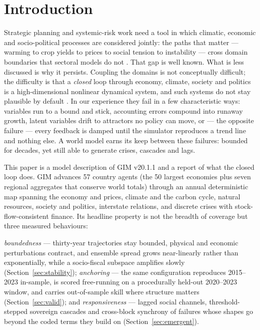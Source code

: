 \documentclass[12pt,a4paper]{article}
\newcommand{\Version}{v20.1.1}
\begin{document}
\section{Introduction}
\label{sec:intro}

Strategic planning and systemic-risk work need a tool in which climatic, economic and
socio-political processes are considered jointly: the paths that matter --- warming to crop
yields to prices to social tension to instability --- cross domain boundaries that sectoral
models do not \citep{nordhaus2017,riahi2017}. That gap is well known. What is less discussed
is why it persists. Coupling the domains is not conceptually difficult; the difficulty is
that a \emph{closed} loop through economy, climate, society and politics is a
high-dimensional nonlinear dynamical system, and such systems do not stay plausible by
default \citep{may1972,sterman2000}. In our experience they fail in a few characteristic ways:
variables run to a bound and stick, accounting errors compound into runaway growth, latent
variables drift to attractors no policy can move, or --- the opposite failure --- every
feedback is damped until the simulator reproduces a trend line and nothing else. A world model
earns its keep between these failures: bounded for decades, yet still able to generate crises,
cascades and lags.

This paper is a model description of GIM \Version{} and a report of what the closed loop
does. GIM advances 57 country agents (the 50 largest economies plus seven regional aggregates
that conserve world totals) through an annual deterministic map spanning the economy and
prices, climate and the carbon cycle, natural resources, society and politics, interstate
relations, and discrete crises with stock-flow-consistent finance. Its headline property is
not the breadth of coverage but three measured behaviours:

\emph{boundedness} --- thirty-year trajectories stay bounded, physical and economic
perturbations contract, and ensemble spread grows near-linearly rather than exponentially,
while a socio-fiscal subspace amplifies slowly (Section~\ref{sec:stability});
\emph{anchoring} --- the same configuration reproduces 2015--2023 in-sample, is scored
free-running on a procedurally held-out 2020--2023 window, and carries out-of-sample skill
where structure matters (Section~\ref{sec:valid}); and \emph{responsiveness} --- lagged social
channels, threshold-stepped sovereign cascades and cross-block synchrony of failures whose
shapes go beyond the coded terms they build on (Section~\ref{sec:emergent}).
\end{document}

